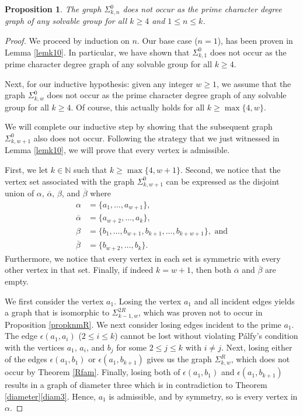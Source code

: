 \documentclass[11pt]{amsart}
\newtheorem{proposition}[theorem]{Proposition}
\theoremstyle{definition}
\theoremstyle{remark}
\numberwithin{equation}{section}
\newcommand{\SR}[2]{\Sigma_{#1,#2}^R} %
\newcommand{\SRi}[3]{\Sigma_{#1,#2}^{#3R}} %
\newcommand{\SZ}[2]{\Sigma_{#1,#2}^0} %
\begin{document}
\begin{proposition}\label{propkn0}
The graph $\SZ{k}{n}$ does not occur as the prime character degree graph of any solvable group for all $k\geq4$ and $1\leq n\leq k$.
\end{proposition}
\begin{proof}
We proceed by induction on $n$.
Our base case ($n=1$), has been proven in Lemma \ref{lemk10}. In particular, we have shown that $\SZ{k}{1}$ does not occur as the prime character degree graph of any solvable group for all $k\geq4$.

Next, for our inductive hypothesis: given any integer $w\geq1$, we assume that the graph $\SZ{k}{w}$ does not occur as the prime character degree graph of any solvable group for all $k\geq4$. Of course, this actually holds for all $k\geq\max\{4,w\}$.

We will complete our inductive step by showing that the subsequent graph $\SZ{k}{w+1}$ also does not occur. Following the strategy that we just witnessed in Lemma \ref{lemk10}, we will prove that every vertex is admissible.

First, we let $k\in\mathbb{N}$ such that $k\geq\max\{4,w+1\}$. Second, we notice that the vertex set associated with the graph $\SZ{k}{w+1}$ can be expressed as the disjoint union of $\alpha$, $\overline{\alpha}$, $\beta$, and $\overline{\beta}$ where
\begin{align*}
\alpha&=\{a_1,\ldots,a_{w+1}\},\\
\overline{\alpha}&=\{a_{w+2},\ldots,a_k\},\\
\beta&=\{ b_1,\ldots,b_{w+1},b_{k+1},\ldots,b_{k+w+1}\},\text{~and}\\
\overline{\beta}&=\{b_{w+2},\ldots,b_k\}.
\end{align*}
Furthermore, we notice that every vertex in each set is symmetric with every other vertex in that set. Finally, if indeed $k=w+1$, then both $\overline{\alpha}$ and $\overline{\beta}$ are empty.

We first consider the vertex $a_1$. Losing the vertex $a_1$ and all incident edges yields a graph that is isomorphic to $\SRi{k-1}{w}{2}$, which was proven not to occur in Proposition \ref{propknmR}. We next consider losing edges incident to the prime $a_1$. The edge $\epsilon(a_1,a_i)$ ($2\leq i\leq k$) cannot be lost without violating P\'alfy's condition with the vertices $a_1$, $a_i$, and $b_j$ for some $2\leq j\leq k$ with $i\neq j$. Next, losing either of the edges $\epsilon(a_1,b_1)$ or $\epsilon(a_1,b_{k+1})$ gives us the graph $\SR{k}{w}$, which does not occur by Theorem \ref{Rfam}. Finally, losing both of $\epsilon(a_1,b_1)$ and $\epsilon(a_1,b_{k+1})$ results in a graph of diameter three which is in contradiction to Theorem \ref{diameter}\eqref{diam3}. Hence, $a_1$ is admissible, and by symmetry, so is every vertex in $\alpha$.


\end{proof}
\end{document}
